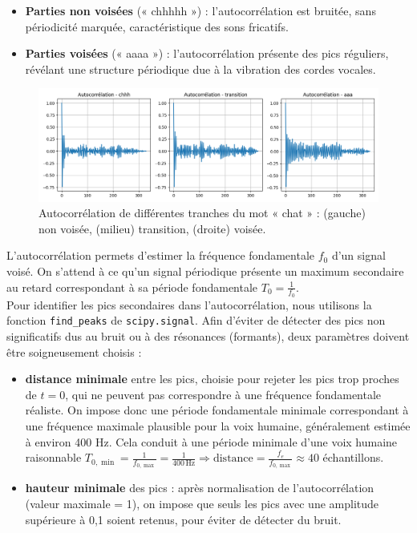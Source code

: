 \begin{itemize}
    \item \textbf{Parties non voisées} (« chhhhh ») : l'autocorrélation est bruitée, sans périodicité marquée, caractéristique des sons fricatifs.
    \item \textbf{Parties voisées} (« aaaa ») : l'autocorrélation présente des pics réguliers, révélant une structure périodique due à la vibration des cordes vocales.
\end{itemize}

\begin{figure}[h!]
    \centering
    \includegraphics[width=17cm]{screenshots/autocorrelation_chat_2.png}
    \caption{Autocorrélation de différentes tranches du mot « chat » : (gauche) non voisée, (milieu) transition, (droite) voisée.}
\end{figure}


L’autocorrélation permets d'estimer la fréquence fondamentale \(f_0\) d’un signal voisé. On s’attend à ce qu’un signal périodique présente un maximum secondaire au retard correspondant à sa période fondamentale \(T_0 = \frac{1}{f_0}\).\\

Pour identifier les pics secondaires dans l’autocorrélation, nous utilisons la fonction \verb|find_peaks| de \texttt{scipy.signal}.
Afin d’éviter de détecter des pics non significatifs dus au bruit ou à des résonances (formants), deux paramètres doivent être soigneusement choisis :

\begin{itemize}
    \item \textbf{distance minimale} entre les pics, choisie pour rejeter les pics trop proches de \(t = 0\), qui ne peuvent pas correspondre à une fréquence fondamentale réaliste. On impose donc une période fondamentale minimale correspondant à une fréquence maximale plausible pour la voix humaine, généralement estimée à environ 400 Hz. Cela conduit à une période minimale d’une voix humaine raisonnable \(T_{0,\min} = \frac{1}{f_{0,\max}} = \frac{1}{400\,\mathrm{Hz}} \Rightarrow \text{distance} = \frac{f_e}{f_{0,\max}} \approx 40\) échantillons.
    \item \textbf{hauteur minimale} des pics : après normalisation de l’autocorrélation (valeur maximale = 1), on impose que seuls les pics avec une amplitude supérieure à 0{,}1 soient retenus, pour éviter de détecter du bruit.
\end{itemize}

